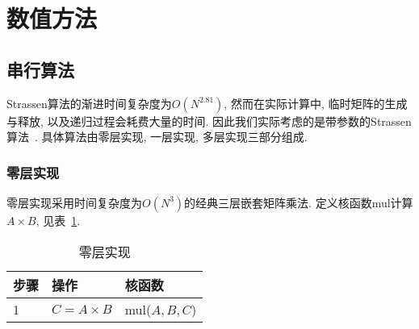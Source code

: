 \documentclass[szjs]{cjcmltx}
\begin{document}
\section{数值方法}
\subsection{串行算法}
Strassen算法的渐进时间复杂度为$O(N^{2.81})$, 然而在实际计算中, 临时矩阵的生成与释放, 以及递归过程会耗费大量的时间. 因此我们实际考虑的是带参数的Strassen算法~\cite{Li:2011}. 具体算法由零层实现, 一层实现, 多层实现三部分组成.

\subsubsection{零层实现}
零层实现采用时间复杂度为$O(N^3)$的经典三层嵌套矩阵乘法. 定义核函数mul计算$A\times B$, 见表~\ref{tab:zero}.

\begin{table}[htbp]\centering\caption{零层实现}\label{tab:zero}
\begin{tabular}{|l|l|l|}
\hline
步骤 & 操作& 核函数\\
\hline
1 & $C=A\times B$ & mul($A, B, C$)\\
\hline
\end{tabular}
\end{table}
\end{document}

